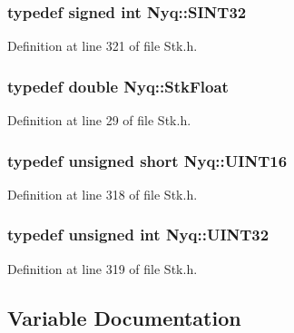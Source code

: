 \subsubsection[{\texorpdfstring{S\+I\+N\+T32}{SINT32}}]{\setlength{\rightskip}{0pt plus 5cm}typedef signed {\bf int} {\bf Nyq\+::\+S\+I\+N\+T32}}\hypertarget{namespace_nyq_a9f9177b528d1412e9846059b0145de19}{}\label{namespace_nyq_a9f9177b528d1412e9846059b0145de19}


Definition at line 321 of file Stk.\+h.

\subsubsection[{\texorpdfstring{Stk\+Float}{StkFloat}}]{\setlength{\rightskip}{0pt plus 5cm}typedef double {\bf Nyq\+::\+Stk\+Float}}\hypertarget{namespace_nyq_a044fa20a706520a617bbbf458a7db7e4}{}\label{namespace_nyq_a044fa20a706520a617bbbf458a7db7e4}


Definition at line 29 of file Stk.\+h.

\subsubsection[{\texorpdfstring{U\+I\+N\+T16}{UINT16}}]{\setlength{\rightskip}{0pt plus 5cm}typedef unsigned short {\bf Nyq\+::\+U\+I\+N\+T16}}\hypertarget{namespace_nyq_ace5c4d33af58cc46325c31da9cf930cd}{}\label{namespace_nyq_ace5c4d33af58cc46325c31da9cf930cd}


Definition at line 318 of file Stk.\+h.

\subsubsection[{\texorpdfstring{U\+I\+N\+T32}{UINT32}}]{\setlength{\rightskip}{0pt plus 5cm}typedef unsigned {\bf int} {\bf Nyq\+::\+U\+I\+N\+T32}}\hypertarget{namespace_nyq_ab39e8701b04b7cff62d700999f9f5691}{}\label{namespace_nyq_ab39e8701b04b7cff62d700999f9f5691}


Definition at line 319 of file Stk.\+h.



\subsection{Variable Documentation}
